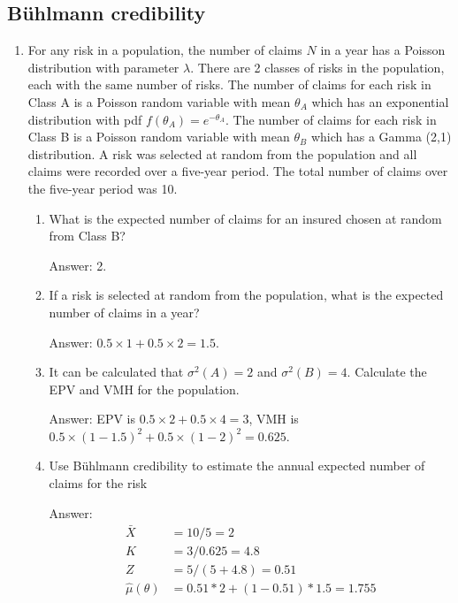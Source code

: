 \documentclass[11pt,a4paper,onecolumn]{article}
\begin{document}
\subsection{B\"{u}hlmann credibility}
\begin{enumerate}
	\item For any risk in a population, the number of claims $N$ in a year has a Poisson distribution with parameter $\lambda$. There are 2 classes of risks in the population, each with the same number of risks. The number of claims for each risk in Class A is a Poisson random variable with mean $\theta_A$ which has an exponential distribution with pdf $f(\theta_A) = e^{-\theta_A}$. The number of claims for each risk in Class B is a Poisson random variable with mean $\theta_B$ which has a Gamma (2,1) distribution. A risk was selected at random from the population and all claims were recorded over a five-year period. The total number of claims over the five-year period was 10.
	\begin{enumerate}
		\item What is the expected number of claims for an insured chosen at random from Class B?\par
		Answer: 2.
		\item If a risk is selected at random from the population, what is the expected number of claims in a year?\par
		Answer: $0.5\times 1 + 0.5 \times 2 = 1.5$.
		\item It can be calculated that $\sigma^2(A) = 2$ and $\sigma^2(B) = 4$. Calculate the EPV and VMH for the population. \par
		Answer: EPV is $0.5\times 2+0.5\times 4 = 3$, VMH is $0.5\times(1-1.5)^2 + 0.5\times (1-2)^2 = 0.625$.
		\item Use B\"{u}hlmann credibility to estimate the annual expected number of claims for the risk\par
		Answer:
		\begin{align*}
		\bar{X} & = 10/5=2\\
		K & = 3/0.625 = 4.8\\
		Z & = 5/(5+4.8) = 0.51\\
		\hat{\mu}(\theta) &=0.51*2 + (1-0.51)*1.5 = 1.755
		\end{align*}
	\end{enumerate}

\end{enumerate}
\end{document}
